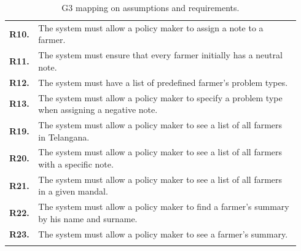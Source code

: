 \begin{longtable}{p{0.06\linewidth} p{0.88\linewidth}}
	\textbf{R10.} & The system must allow a policy maker to assign a note to a farmer.\\
	\textbf{R11.} & The system must ensure that every farmer initially has a neutral note.\\
	\textbf{R12.} & The system must have a list of predefined farmer's problem types.\\
    \textbf{R13.} & The system must allow a policy maker to specify a problem type when assigning a negative note.\\
	\textbf{R19.} & The system must allow a policy maker to see a list of all farmers in Telangana.\\
	\textbf{R20.} & The system must allow a policy maker to see a list of all farmers with a specific note.\\
	\textbf{R21.} & The system must allow a policy maker to see a list of all farmers in a given mandal.\\
	\textbf{R22.} & The system must allow a policy maker to find a farmer's summary by his name and surname.\\
	\textbf{R23.} & The system must allow a policy maker to see a farmer's summary.\\
	
    \bottomrule
\caption{G3 mapping on assumptions and requirements.}
\end{longtable}


